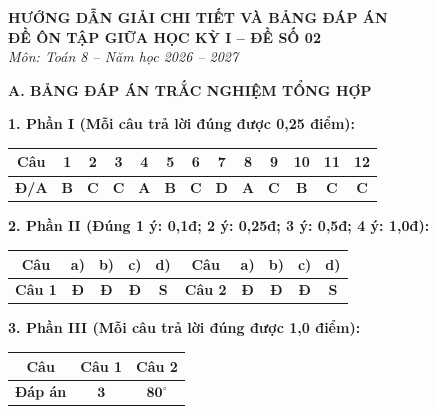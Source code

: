 \documentclass[12pt,a4paper]{article}
\begin{document}
\begin{center}
  \textbf{\Large HƯỚNG DẪN GIẢI CHI TIẾT VÀ BẢNG ĐÁP ÁN}\\
  \textbf{\large ĐỀ ÔN TẬP GIỮA HỌC KỲ I -- ĐỀ SỐ 02}\\
  \textit{Môn: Toán 8 -- Năm học 2026 -- 2027}
\end{center}
\vspace{2mm}

\noindent\textbf{\large A. BẢNG ĐÁP ÁN TRẮC NGHIỆM TỔNG HỢP}
\vspace{1mm}

\noindent\textbf{1. Phần I (Mỗi câu trả lời đúng được 0,25 điểm):}
\begin{center}
\begin{tabular}{|c|c|c|c|c|c|c|c|c|c|c|c|c|}
\hline
\textbf{Câu} & \textbf{1} & \textbf{2} & \textbf{3} & \textbf{4} & \textbf{5} & \textbf{6} & \textbf{7} & \textbf{8} & \textbf{9} & \textbf{10} & \textbf{11} & \textbf{12} \\
\hline
\textbf{Đ/A} & \textbf{B} & \textbf{C} & \textbf{C} & \textbf{A} & \textbf{B} & \textbf{C} & \textbf{D} & \textbf{A} & \textbf{C} & \textbf{B} & \textbf{C} & \textbf{C} \\
\hline
\end{tabular}
\end{center}
\vspace{0.5mm}

\noindent\textbf{2. Phần II (Đúng 1 ý: 0,1đ; 2 ý: 0,25đ; 3 ý: 0,5đ; 4 ý: 1,0đ):}
\begin{center}
\begin{tabular}{|c|c|c|c|c||c|c|c|c|c|}
\hline
\textbf{Câu} & \textbf{a)} & \textbf{b)} & \textbf{c)} & \textbf{d)} & \textbf{Câu} & \textbf{a)} & \textbf{b)} & \textbf{c)} & \textbf{d)} \\
\hline
\textbf{Câu 1} & \textbf{Đ} & \textbf{Đ} & \textbf{Đ} & \textbf{S} & \textbf{Câu 2} & \textbf{Đ} & \textbf{Đ} & \textbf{Đ} & \textbf{S} \\
\hline
\end{tabular}
\end{center}
\vspace{0.5mm}

\noindent\textbf{3. Phần III (Mỗi câu trả lời đúng được 1,0 điểm):}
\begin{center}
\begin{tabular}{|c|c|c|}
\hline
\textbf{Câu} & \textbf{Câu 1} & \textbf{Câu 2} \\
\hline
\textbf{Đáp án} & $\mathbf{3}$ & $\mathbf{80^\circ}$ \\
\hline
\end{tabular}
\end{center}
\vspace{1.5mm}
\end{document}
